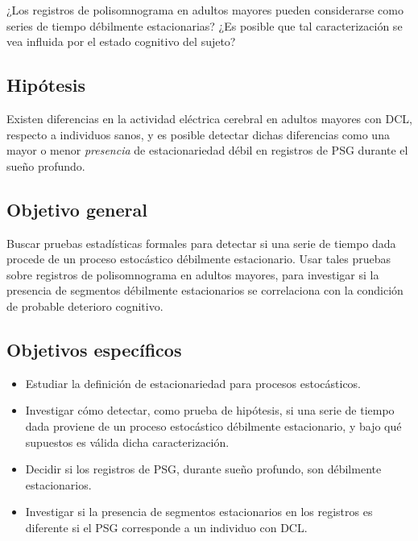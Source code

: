 ¿Los registros de polisomnograma en adultos mayores pueden considerarse como series de tiempo 
débilmente estacionarias?
%
¿Es posible que tal caracterización se vea influida por el estado cognitivo del sujeto?


\subsection{Hipótesis}

Existen diferencias en la actividad eléctrica cerebral en adultos mayores con DCL, respecto a 
individuos sanos, y es posible detectar dichas diferencias como una mayor o menor 
\textit{presencia} de estacionariedad débil en registros de PSG durante el sueño profundo.


\subsection{Objetivo general}

Buscar pruebas estadísticas formales para detectar si una serie de tiempo dada procede de un 
proceso estocástico débilmente estacionario.
%
Usar tales pruebas sobre registros de polisomnograma en adultos mayores, para investigar si la 
presencia de segmentos débilmente estacionarios se correlaciona con la condición de probable
deterioro cognitivo.


\subsection{Objetivos específicos}

\begin{itemize}
\item Estudiar la definición de estacionariedad para procesos estocásticos.

\item Investigar cómo detectar, como prueba de hipótesis, si una serie de tiempo dada proviene
de un proceso estocástico débilmente estacionario, y bajo qué supuestos 
es válida dicha caracterización.

\item Decidir si los registros de PSG, durante sueño profundo, son débilmente estacionarios.

\item Investigar si la presencia de segmentos estacionarios en los registros es diferente si el
PSG corresponde a un individuo con DCL.
\end{itemize}

